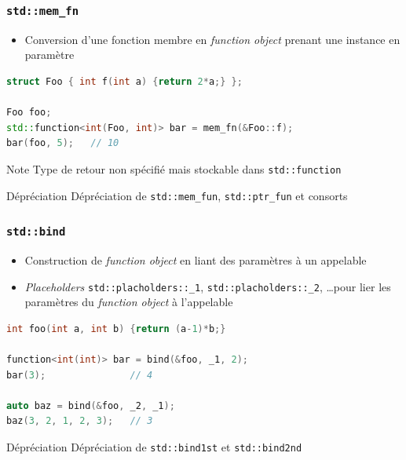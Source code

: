 \documentclass[C++.tex]{subfiles}
\begin{document}
\begin{frame}[fragile]
	\frametitle{\lstinline|std::mem_fn|}
	\begin{itemize}
		\item Conversion d'une fonction membre en \textit{function object} prenant une instance en paramètre
	\end{itemize}

	\begin{lstlisting}[language=C++]
struct Foo { int f(int a) {return 2*a;} };

Foo foo;
std::function<int(Foo, int)> bar = mem_fn(&Foo::f);
bar(foo, 5);   // 10\end{lstlisting}

	\begin{block}{Note}
		Type de retour non spécifié mais stockable dans \lstinline|std::function|
	\end{block}

	\begin{block}{Dépréciation}
		Dépréciation de \lstinline|std::mem_fun|, \lstinline|std::ptr_fun| et consorts

	\end{block}
\end{frame}

\begin{frame}[fragile]
	\frametitle{\lstinline|std::bind|}
	\begin{itemize}
		\item Construction de \textit{function object} en liant des paramètres à un appelable
		\item \textit{Placeholders} \lstinline|std::placholders::_1|, \lstinline|std::placholders::_2|, \ldots pour lier les paramètres du \textit{function object} à l'appelable
	\end{itemize}

	\begin{lstlisting}[language=C++]
int foo(int a, int b) {return (a-1)*b;}

function<int(int)> bar = bind(&foo, _1, 2);
bar(3);               // 4

auto baz = bind(&foo, _2, _1);
baz(3, 2, 1, 2, 3);   // 3\end{lstlisting}	


	\begin{block}{Dépréciation}
		Dépréciation de \lstinline|std::bind1st| et \lstinline|std::bind2nd|

	\end{block}
\end{frame}
\end{document}
